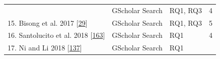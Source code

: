 \documentclass[]{book}
\begin{document}
\begin{longtable}[]{@{}llll@{}}
\begin{minipage}[t]{0.48\columnwidth}
\end{minipage} & \begin{minipage}[t]{0.20\columnwidth}\raggedright\strut
GScholar Search\strut
\end{minipage} & \begin{minipage}[t]{0.14\columnwidth}\raggedright\strut
RQ1, RQ3\strut
\end{minipage} & \begin{minipage}[t]{0.06\columnwidth}\raggedright\strut
4\strut
\end{minipage}\tabularnewline
\begin{minipage}[t]{0.48\columnwidth}\raggedright\strut
15. Bisong et al. 2017
{[}\protect\hyperlink{ref-bisong2017built}{29}{]}\strut
\end{minipage} & \begin{minipage}[t]{0.20\columnwidth}\raggedright\strut
GScholar Search\strut
\end{minipage} & \begin{minipage}[t]{0.14\columnwidth}\raggedright\strut
RQ1, RQ3\strut
\end{minipage} & \begin{minipage}[t]{0.06\columnwidth}\raggedright\strut
5\strut
\end{minipage}\tabularnewline
\begin{minipage}[t]{0.48\columnwidth}\raggedright\strut
16. Santolucito et al. 2018
{[}\protect\hyperlink{ref-santolucito2018statically}{163}{]}\strut
\end{minipage} & \begin{minipage}[t]{0.20\columnwidth}\raggedright\strut
GScholar Search\strut
\end{minipage} & \begin{minipage}[t]{0.14\columnwidth}\raggedright\strut
RQ1\strut
\end{minipage} & \begin{minipage}[t]{0.06\columnwidth}\raggedright\strut
4\strut
\end{minipage}\tabularnewline
\begin{minipage}[t]{0.48\columnwidth}\raggedright\strut
17. Ni and Li 2018 {[}\protect\hyperlink{ref-ni2018acona}{137}{]}\strut
\end{minipage} & \begin{minipage}[t]{0.20\columnwidth}\raggedright\strut
GScholar Search\strut
\end{minipage} & \begin{minipage}[t]{0.14\columnwidth}\raggedright\strut
RQ1\strut
\end{minipage} & \begin{minipage}[t]{0.06\columnwidth}\raggedright\strut

\end{minipage}
\end{longtable}
\end{document}
